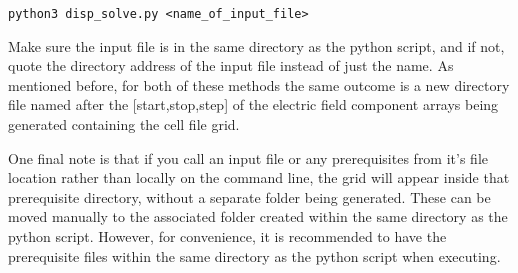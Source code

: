 \documentclass[10pt]{article}
\begin{document}
\texttt{python3 disp\_solve.py <name\_of\_input\_file>}

Make sure the input file is in the same directory as the python script, and if not, quote the directory address of the input file instead of just the name. As mentioned before, for both of these methods the same outcome is a new directory file named after the [start,stop,step] of the electric field component arrays being generated containing the cell file grid.

One final note is that if you call an input file or any prerequisites from it's file location rather than locally on the command line, the grid will appear inside that prerequisite directory, without a separate folder being generated. These can be moved manually to the associated folder created within the same directory as the python script. However, for convenience, it is recommended to have the prerequisite files within the same directory as the python script when executing.



\end{document}
